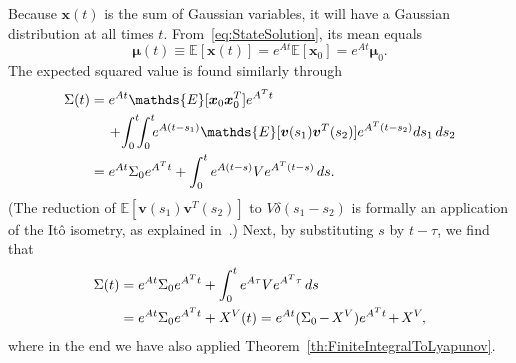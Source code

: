 \documentclass[twocolumn]{autart}
\newcommand{\ve}[1]{{\boldsymbol{#1}}} \newcommand{\tr}{\mbox{tr}} \newcommand{\ex}{\mathds{E}} \newcommand{\va}{\mathds{V}}
\begin{document}
\begin{pf}
Because $\ve{x}(t)$ is the sum of Gaussian variables, it will have a Gaussian distribution at all times $t$. From~\eqref{eq:StateSolution}, its mean equals
\begin{equation}
\ve{\mu}(t) \equiv \ex[\ve{x}(t)] = e^{A t} \ex[\ve{x}_0] = e^{A t} \ve{\mu}_0.
\end{equation}
The expected squared value is found similarly through
\begin{align}
\Sigma(t) & = e^{A t} \ex[\ve{x}_0 \ve{x}_0^T] e^{A^T t} \nonumber \\
& \hspace{12pt} + \hspace{-2pt} \int_0^t \hspace{-4pt} \int_0^t \hspace{-4pt} e^{A (t-s_1)} \ex[\ve{v}(s_1) \ve{v}^T(s_2)] e^{A^T (t-s_2)} ds_1 \, ds_2 \nonumber \\
& = e^{A t} \Sigma_0 e^{A^T t} + \int_0^t e^{A (t-s)} V e^{A^T (t-s)} \, ds. \label{eq:SigmaTIntermediateExpression}
\end{align}
(The reduction of $\ex[\ve{v}(s_1) \ve{v}^T(s_2)]$ to $V \delta(s_1 - s_2)$ is formally an application of the It\^o isometry, as explained in~\cite{StochasticDEBook}.) Next, by substituting $s$ by $t - \tau$, we find that
\begin{align}
\Sigma(t) & = e^{A t} \Sigma_0 e^{A^T t} + \int_0^t e^{A \tau} V e^{A^T \tau} \, ds \label{eq:DerivationOfStateVariance} \\
& = e^{A t} \Sigma_0 e^{A^T t} + X^V(t) = e^{A t} (\Sigma_0 \hspace{-1pt}-\hspace{-1pt} X^V) e^{A^T t} \hspace{-1pt}+\hspace{-1pt} X^V\hspace{-1pt}, \nonumber
\end{align}
where in the end we have also applied Theorem~\ref{th:FiniteIntegralToLyapunov}.
\end{pf}
\end{document}
